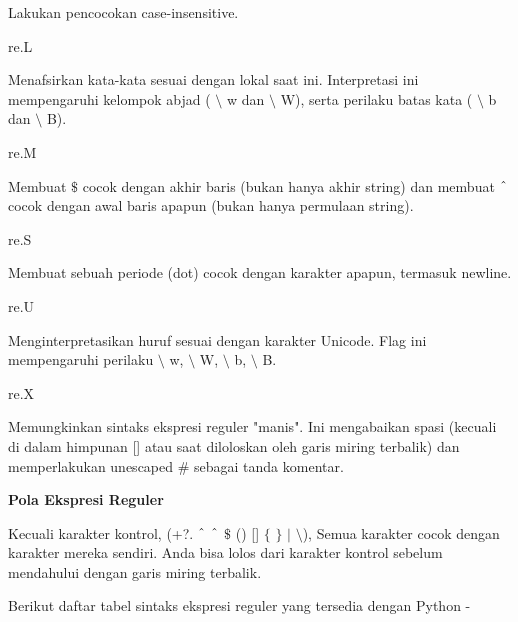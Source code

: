 \noindent 
Lakukan pencocokan case-insensitive. \par
\vspace{12pt}
\noindent 
re.L \hspace*{0.5in}  \par
\noindent 
Menafsirkan kata-kata sesuai dengan lokal saat ini. Interpretasi ini mempengaruhi kelompok abjad ( $  \setminus  $ w dan  $  \setminus  $ W), serta perilaku batas kata ( $  \setminus  $ b dan  $  \setminus  $ B). \par
\vspace{12pt}
\noindent 
re.M \hspace*{0.5in}  \par
\noindent 
Membuat  $  \$  $ cocok dengan akhir baris (bukan hanya akhir string) dan membuat  $  \string^  $ cocok dengan awal baris apapun (bukan hanya permulaan string). \par
\vspace{12pt}
\noindent 
re.S \hspace*{0.5in}  \par
\noindent 
Membuat sebuah periode (dot) cocok dengan karakter apapun, termasuk newline. \par
\noindent 
re.U \hspace*{0.5in}  \par
\noindent 
Menginterpretasikan huruf sesuai dengan karakter Unicode. Flag ini mempengaruhi perilaku  $  \setminus  $ w,  $  \setminus  $ W,  $  \setminus  $ b,  $  \setminus  $ B. \par
\vspace{12pt}
\noindent 
re.X \hspace*{0.5in}  \par
\noindent 
Memungkinkan sintaks ekspresi reguler "manis". Ini mengabaikan spasi (kecuali di dalam himpunan [] atau saat diloloskan oleh garis miring terbalik) dan memperlakukan unescaped  $  \#  $ sebagai tanda komentar. \par
\vspace{12pt}
\noindent 
\textbf{Pola Ekspresi Reguler} \par
\vspace{12pt}
\noindent 
Kecuali karakter kontrol, (+?.  $  \string^  $  $  \string^  $  $  \$  $ () []  $  \{  $ $  \}  $  $  \vert  $  $  \setminus  $), Semua karakter cocok dengan karakter mereka sendiri. Anda bisa lolos dari karakter kontrol sebelum mendahului dengan garis miring terbalik. \par
\noindent 
Berikut daftar tabel sintaks ekspresi reguler yang tersedia dengan Python - \par
